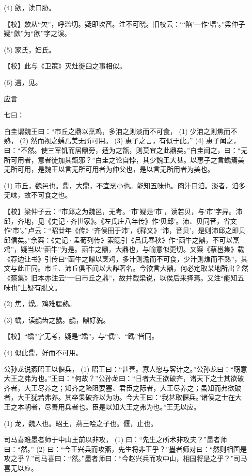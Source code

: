 \documentclass[12pt,UTF8]{ctexbook}
\begin{document}
(4) 歛，读曰胁。

【校】歛从“欠”，呼滥切。疑即坎窞。注不可晓。旧校云：“‘陷’一作‘堛’。”梁仲子疑“歛”为“欿”字之误。

(5) 家氏，妇氏。

【校】此与《卫策》灭灶徙臼之事相似。

(6) 遇，见。





应言


七曰：

白圭谓魏王曰：“市丘之鼎以烹鸡，多洎之则淡而不可食， (1) 少洎之则焦而不熟， (2) 然而视之蝺焉美无所可用。 (3) 惠子之言，有似于此。” (4) 惠子闻之，曰：“不然。使三军饥而居鼎旁，适为之甑，则莫宜之此鼎矣。”白圭闻之，曰：“无所可用者，意者徒加其甑邪？”白圭之论自悖，其少魏王大甚。以惠子之言蝺焉美无所可用，是魏王以言无所可用者为仲父也，是以言无所用者为美也。

(1) 市丘，魏邑也。鼎，大鼎，不宜烹小也。能知五味也。肉汁曰洎。淡者，洎多无味，故不可食之也。

【校】梁仲子云：“市邱之为魏邑，无考。‘巿’疑是‘巿’，读若贝，与‘市’字异。沛邱，齐地，见《史记·齐世家》。《左氏庄八年传》作‘贝邱’。沛、贝同音，省文作‘巿’。”卢云：“昭廿年《传》‘齐侯田于沛’，《释文》‘沛，音贝’，是则沛邱之即贝邱信矣。”余案：《史记·孟荀列传》索隐引《吕氏春秋》作“函牛之鼎，不可以烹鸡”，疑当以“函牛”为是。函牛之鼎，大鼎也，与喻意似更切。又案《蔡邕集》载《荐边让书》引传曰“函牛之鼎以烹鸡，多汁则澹而不可食，少汁则燋而不熟”，其文与此正同。市丘、沛丘俱不闻以大鼎著名。今欲言大鼎，何必定取某地所出？然《蔡集》旧本亦注云“一曰市丘之鼎”，故并载梁说，以俟后来择焉。又注“能知五味也”上疑有脱文。

(2) 焦，燥。鸡难臑熟。

(3) 蝺，读龋齿之龋。龋，鼎好貌。

【校】“蝺”字无考，疑是“竬”，与“偊”、“踽”皆同。

(4) 似此鼎，好而不可用。

公孙龙说燕昭王以偃兵， (1) 昭王曰：“甚善。寡人愿与客计之。”公孙龙曰：“窃意大王之弗为也。”王曰：“何故？”公孙龙曰：“日者大王欲破齐，诸天下之士其欲破齐者，大王尽养之；知齐之险阻要塞、君臣之际者，大王尽养之；虽知而弗欲破者，大王犹若弗养。其卒果破齐以为功。今大王曰：‘我甚取偃兵。’诸侯之士在大王之本朝者，尽善用兵者也。臣是以知大王之弗为也。”王无以应。

(1) 龙，魏人也。昭王，燕王哙之子也。偃，止也。

司马喜难墨者师于中山王前以非攻， (1) 曰：“先生之所术非攻夫？”墨者师曰：“然。” (2) 曰：“今王兴兵而攻燕，先生将非王乎？”墨者师对曰：“然则相国是攻之乎？”司马喜曰：“然。”墨者师曰：“今赵兴兵而攻中山，相国将是之乎？”司马喜无以应。
\end{document}
